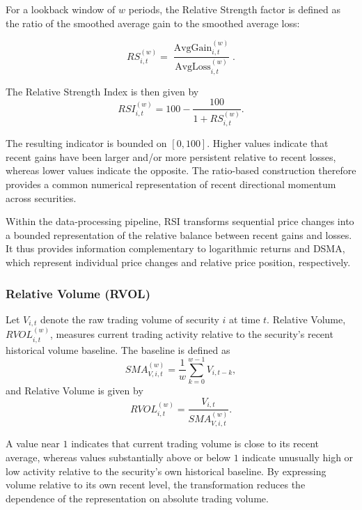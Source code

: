 For a lookback window of $w$ periods, the Relative Strength factor is defined as the ratio of the smoothed average gain to the smoothed average loss:

\begin{equation}
	RS_{i,t}^{(w)}=\frac{\operatorname{AvgGain}_{i,t}^{(w)}}{\operatorname{AvgLoss}_{i,t}^{(w)}}.
\end{equation}

The Relative Strength Index is then given by
\begin{equation}
	RSI_{i,t}^{(w)}
	=
	100-\frac{100}{1+RS_{i,t}^{(w)}}.
\end{equation}

The resulting indicator is bounded on $[0,100]$. Higher values indicate that recent gains have been larger and/or more persistent relative to recent losses, whereas lower values indicate the opposite. The ratio-based construction therefore provides a common numerical representation of recent directional momentum across securities.

\medskip

Within the data-processing pipeline, \acs{RSI} transforms sequential price changes into a bounded representation of the relative balance between recent gains and losses. It thus provides information complementary to logarithmic returns and \acs{DSMA}, which represent individual price changes and relative price position, respectively.

\subsubsection{Relative Volume (RVOL)}
Let $V_{i,t}$ denote the raw trading volume of security $i$ at time $t$. Relative Volume, $RVOL_{i,t}^{(w)}$, measures current trading activity relative to the security's recent historical volume baseline. The baseline is defined as
\begin{equation}
	SMA_{V,i,t}^{(w)}=\frac{1}{w}\sum_{k=0}^{w-1}V_{i,t-k},
\end{equation}
and Relative Volume is given by
\begin{equation}
	RVOL_{i,t}^{(w)}=\frac{V_{i,t}}{SMA_{V,i,t}^{(w)}}.
\end{equation}

A value near $1$ indicates that current trading volume is close to its recent average, whereas values substantially above or below $1$ indicate unusually high or low activity relative to the security's own historical baseline. By expressing volume relative to its own recent level, the transformation reduces the dependence of the representation on absolute trading volume.

